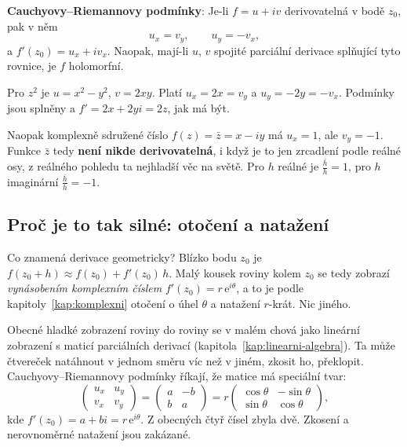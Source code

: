 \begin{definitionbox}
  \textbf{Cauchyovy--Riemannovy podmínky}: Je-li $f = u + iv$ derivovatelná v bodě $z_0$, pak v něm
  \begin{equation*}
    u_x = v_y,\qquad u_y = -v_x,
  \end{equation*}
  a $f'(z_0) = u_x + iv_x$. Naopak, mají-li $u$, $v$ spojité parciální derivace splňující tyto rovnice, je $f$ holomorfní.
\end{definitionbox}

\begin{example}
  Pro $z^2$ je $u = x^2 - y^2$, $v = 2xy$. Platí $u_x = 2x = v_y$ a $u_y = -2y = -v_x$. Podmínky jsou splněny a $f' = 2x + 2yi = 2z$, jak má být.

  Naopak komplexně sdružené číslo $f(z) = \bar{z} = x - iy$ má $u_x = 1$, ale $v_y = -1$. Funkce $\bar{z}$ tedy \textbf{není nikde derivovatelná}, i když je to jen zrcadlení podle reálné osy, z reálného pohledu ta nejhladší věc na světě. Pro $h$ reálné je $\frac{\bar{h}}{h} = 1$, pro $h$ imaginární $\frac{\bar{h}}{h} = -1$.
\end{example}

\subsection{Proč je to tak silné: otočení a natažení}

Co znamená derivace geometricky? Blízko bodu $z_0$ je $f(z_0 + h)\approx f(z_0) + f'(z_0)\,h$. Malý kousek roviny kolem $z_0$ se tedy zobrazí \textit{vynásobením komplexním číslem} $f'(z_0) = r\,\mathrm{e}^{i\theta}$, a to je podle kapitoly~\ref{kap:komplexni} otočení o úhel $\theta$ a natažení $r$-krát. Nic jiného.

Obecné hladké zobrazení roviny do roviny se v malém chová jako lineární zobrazení s maticí parciálních derivací (kapitola~\ref{kap:linearni-algebra}). Ta může čtvereček natáhnout v jednom směru víc než v jiném, zkosit ho, překlopit. Cauchyovy--Riemannovy podmínky říkají, že matice má speciální tvar:
\begin{equation*}
  \begin{pmatrix} u_x & u_y\\ v_x & v_y\end{pmatrix} = \begin{pmatrix} a & -b\\ b & a\end{pmatrix} = r\begin{pmatrix}\cos\theta & -\sin\theta\\ \sin\theta & \cos\theta\end{pmatrix},
\end{equation*}
kde $f'(z_0) = a + bi = r\,\mathrm{e}^{i\theta}$. Z obecných čtyř čísel zbyla dvě. Zkosení a nerovnoměrné natažení jsou zakázané.

